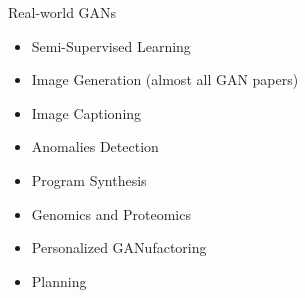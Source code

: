 \documentclass{beamer}
\begin{document}

\appendix

\begin{frame}{Real-world GANs }
	\begin{itemize}
		\item Semi-Supervised Learning \citep{salimansImprovedTechniquesTraining2016a}
		\item Image Generation (almost all GAN papers)
		\item Image Captioning
		\item Anomalies Detection \citep{zenatiEfficientGANBasedAnomaly2018a}
		\item Program Synthesis \citep{ganinSynthesizingProgramsImages2018}
		\item Genomics and Proteomics \citep{killoranGeneratingDesigningDNA2017} \citep{decaoMolGANImplicitGenerative2018}
		\item Personalized GANufactoring \citep{hwangLearningHumanExpertise2018}
		\item Planning
	\end{itemize}
\end{frame}

\begin{frame}[allowframebreaks]
	 
	
\end{frame}
\end{document}
